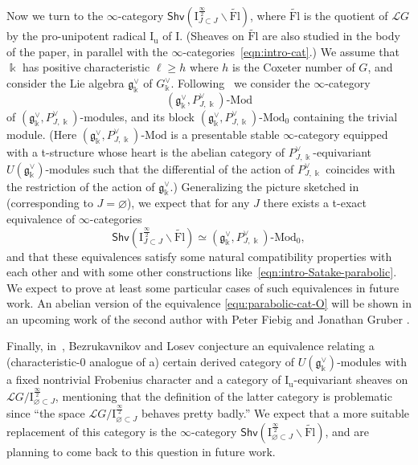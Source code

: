\documentclass[11pt]{amsart}
\numberwithin{equation}{section}
\theoremstyle{plain}
\theoremstyle{definition}
\newcommand{\I}{{\mathrm I}}
\renewcommand{\k}{\Bbbk}
\newcommand{\sL}{{\mathcal L}}
\newcommand{\Mod}{\text{-}\mathrm{Mod}}
\newcommand{\fg}{\mathrm{fg}}
\newcommand{\semi}{{{\frac{\infty}{2}}}}
\newcommand{\Shv}{\mathsf{Shv}}
\newcommand{\Fl}{\mathrm{Fl}}
\newcommand{\tFl}{\widetilde{\Fl}}
\newcommand{\Iu}{\mathrm{I}_{\mathrm{u}}}
\begin{document}
Now we turn to the $\infty$-category $\Shv \left( \I^\semi_{J \subset J} \backslash \tFl \right)$, where $\tFl$ is the quotient of $\sL G$ by the pro-unipotent radical $\Iu$ of $\I$. (Sheaves on $\tFl$ are also studied in the body of the paper, in parallel with the $\infty$-categories~\eqref{eqn:intro-cat}.) We assume that $\k$ has positive characteristic $\ell \geq h$ where $h$ is the Coxeter number of $G$, and consider the Lie algebra $\mathfrak{g}^\vee_\k$ of $G^\vee_\k$. 
Following~\cite{adr-cat} we consider the $\infty$-category
\[
(\mathfrak{g}^\vee_\k,P^\vee_{J,\k})\Mod
\]
of $(\mathfrak{g}^\vee_\k,P^\vee_{J,\k})$-modules, and its block $(\mathfrak{g}^\vee_\k,P^\vee_{J,\k})\Mod_0$ containing the trivial module. (Here $(\mathfrak{g}^\vee_\k,P^\vee_{J,\k})\Mod$ is a presentable stable $\infty$-category equipped with a t-structure whose heart is the abelian category of $P^\vee_{J,\k}$-equivariant $U(\mathfrak{g}^\vee_\k)$-modules such that the differential of the action of $P^\vee_{J,\k}$ coincides with the restriction of the action of $\mathfrak{g}^\vee_\k$.) Generalizing the picture sketched in~\cite[\S 1.4]{adr} (corresponding to $J=\varnothing$), we expect that for any $J$ there exists a t-exact equivalence of $\infty$-categories
\begin{equation}\label{equ:parabolic-cat-O}
\Shv \left( \I^\semi_{J \subset J} \backslash \tFl \right) \simeq (\mathfrak{g}^\vee_\k,P^\vee_{J,\k})\Mod_0,
\end{equation}
and that these equivalences satisfy some natural compatibility properties with each other and with some other constructions like~\eqref{eqn:intro-Satake-parabolic}. We expect to prove at least some particular cases of such equivalences in future work. 
An abelian version of the equivalence \eqref{equ:parabolic-cat-O} will be shown in an upcoming work of the second author with Peter Fiebig and Jonathan Gruber \cite{FGS}. 

Finally, in~\cite[\S 8.11]{bez-losev}, Bezrukavnikov and Losev conjecture an equivalence relating a (characteristic-$0$ analogue of a) certain derived category of $U(\mathfrak{g}^\vee_\k)$-modules with a fixed nontrivial Frobenius character and a category of $\Iu$-equivariant sheaves on $\sL G / \I_{\varnothing \subset J}^\semi$, mentioning that the definition of the latter category is problematic since ``the space $\sL G / \I_{\varnothing \subset J}^\semi$ behaves pretty badly.'' We expect that a more suitable replacement of this category is the $\infty$-category $\Shv \left( \I^\semi_{\varnothing \subset J} \backslash \tFl \right)$, and are planning to come back to this question in future work.
\end{document}
